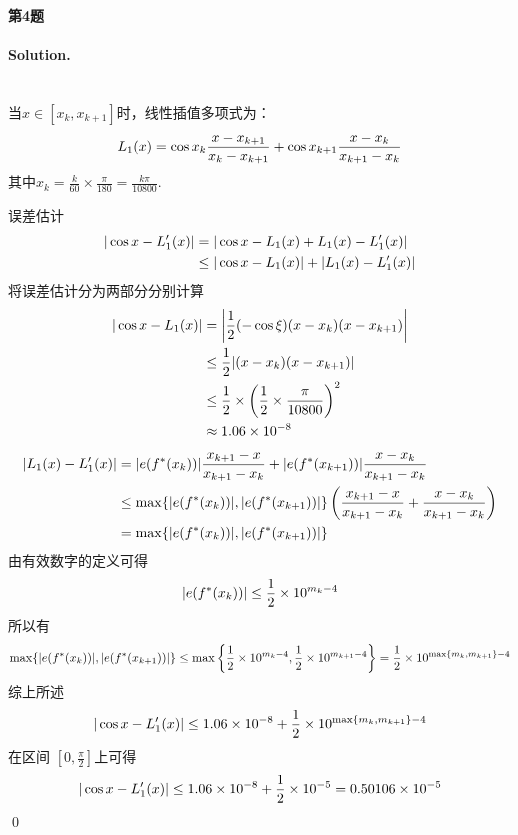 \documentclass[a4paper]{article}
\newenvironment{solution}
{\color{blue} \paragraph{Solution.}}
{\newline \qed}
\begin{document}
	\paragraph{第4题}
\begin{solution}
 \leavevmode \\
	当$x\in [x_k, x_{k+1}]$时，线性插值多项式为：
	\begin{equation}
		L_1(x) = \cos x_k \frac{x-x_{k+1}}{x_k-x_{k+1}}+\cos x_{k+1}\frac{x-x_k}{x_{k+1}-x_k} \notag
	\end{equation}
	其中$x_k = \frac{k}{60} \times \frac{\pi}{180} = \frac{k\pi}{10800}$.
 
误差估计
	\begin{equation}
		\begin{split}
			|\cos x - L'_1(x)| &= |\cos x - L_1(x) + L_1(x) - L'_1(x)| \\
			&\leq |\cos x - L_1(x)| + |L_1(x)-L'_1(x)|
		\end{split}
		\notag
	\end{equation}
	将误差估计分为两部分分别计算
	\begin{equation}
		\begin{split}
			|\cos x - L_1(x)| &= \left| \frac{1}{2}(-\cos \xi)(x-x_k)(x-x_{k+1}) \right| \\
			&\leq \frac{1}{2} |(x-x_k)(x-x_{k+1})| \\
			&\leq \frac{1}{2}\times \left( \frac{1}{2} \times \frac{\pi}{10800} \right) ^2 \\
			&\approx 1.06 \times 10^{-8}
		\end{split}
		\notag
	\end{equation}
	\begin{equation}
		\begin{split}
			|L_1(x)-L'_1(x)| &= |e(f^*(x_k))|\frac{x_{k+1}-x}{x_{k+1}-x_k} + |e(f^*(x_{k+1}))|\frac{x-x_k}{x_{k+1}-x_k}\\
			&\leq \max \{|e(f^*(x_k))|, |e(f^*(x_{k+1}))|\} \left( \frac{x_{k+1}-x}{x_{k+1}-x_k} + \frac{x-x_k}{x_{k+1}-x_k} \right) \\
			&= \max \{|e(f^*(x_k))|, |e(f^*(x_{k+1}))|\}
		\end{split}
		\notag
	\end{equation}
	由有效数字的定义可得
	\begin{equation}
		|e(f^*(x_k))| \leq \frac{1}{2}\times 10^{m_k-4} \notag
	\end{equation}
	所以有
	\begin{equation}
		\max \{|e(f^*(x_k))|, |e(f^*(x_{k+1}))|\} \leq \max \left\{ \frac{1}{2}\times 10^{m_k-4}, \frac{1}{2}\times 10^{m_{k+1}-4} \right\} = \frac{1}{2}\times 10^{\max \{m_k, m_{k+1}\}-4} \notag
	\end{equation}
	综上所述
	\begin{equation}
		|\cos x-L'_1(x)| \leq 1.06\times 10^{-8} + \frac{1}{2}\times 10^{\max \{m_k, m_{k+1}\}-4} \notag
	\end{equation}
	在区间 $[0, \frac{\pi}{2}]$上可得
	\begin{equation}
		|\cos x-L'_1(x)|\leq 1.06 \times 10^{-8} + \frac{1}{2}\times 10^{-5} = 0.50106 \times 10^{-5} \notag
	\end{equation}
\end{solution}
\end{document}
